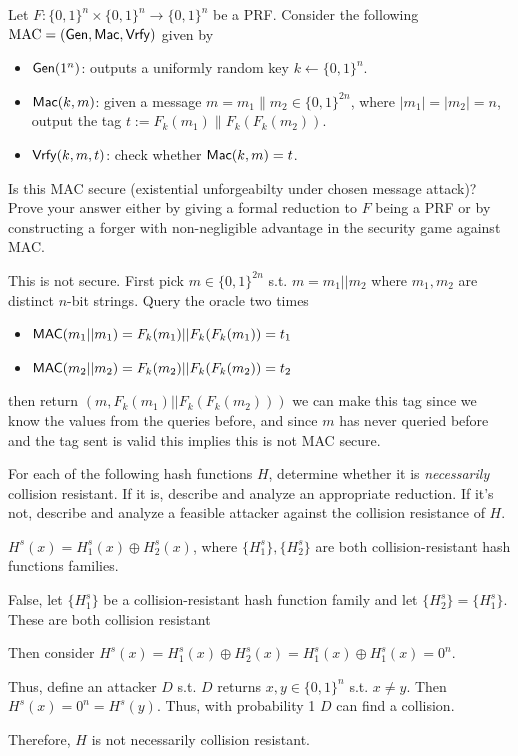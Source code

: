 \documentclass[12pt, letterpaper]{article}
\renewcommand{\t}[1]{\text{#1}}
\newcommand{\skcgen}{{\sf Gen}}
\newcommand{\mac}{{\sf MAC}}
\begin{document}
\begin{problem}{}
    Let $F\colon \{0,1\}^n \times \{0,1\}^n \rightarrow \{0,1\}^n$ be a PRF. 
  Consider the following\\ $\t{MAC}=(\skcgen,{\sf Mac},{\sf Vrfy})$ given by
  \begin{itemize}
    \item $\skcgen(1^n)$: outputs a uniformly random key $k\gets \{0,1\}^n$.
    \item ${\sf Mac}(k,m)$: given a message $m=m_1\|m_2\in\{0,1\}^{2n}$, 
      where $|m_1|=|m_2|=n$, output the tag $t:=F_k(m_1)\| F_k(F_k(m_2))$.
    \item ${\sf Vrfy}(k,m,t)$: check whether ${\sf Mac}(k,m)=t$.
  \end{itemize}
  Is this MAC secure (existential unforgeabilty under chosen message attack)? Prove your answer either by giving a formal reduction
  to $F$ being a PRF or by constructing a forger with non-negligible advantage
  in the security game against MAC. 
\end{problem}
\begin{problemproof}
    This is not secure. First pick $m \in \{0,1\}^{2n}$ s.t. $m=m_1||m_2$ where $m_1,m_2$ are distinct $n$-bit strings.
    Query the oracle two times
    \begin{itemize}
        \item $\mac(m_1||m_1)=F_k(m_1)||F_k(F_k(m_1))=t_1$
        \item $\mac(m_2||m_2)=F_k(m_2)||F_k(F_k(m_2))=t_2$
    \end{itemize}
    then return $(m, F_k(m_1)||F_k(F_k(m_2)))$ we can make this tag since we know the values from the queries before, and since $m$ has never queried before and the tag sent is valid this implies this is not 
    MAC secure.
\end{problemproof}

\begin{problem}{}
    For each of the following hash functions $H$, determine whether it
  is \emph{necessarily} collision resistant. If it is, describe and
  analyze an appropriate reduction. If it's not, describe and analyze
  a feasible attacker against the collision resistance of $H$.
\end{problem}

\begin{subproblem}{}
    $H^{s}(x) = H_1^{s}(x) \oplus H_2^{s}(x)$, where $\{H^s_1\}, \{H^s_2\}$ are both
    collision-resistant hash functions families.
\end{subproblem}
\begin{problemproof}
    False, let $\{H_1^s\}$ be a collision-resistant hash function family and let $\{H_2^s\}=\{H_1^s\}$. These are both collision
    resistant

    Then consider $H^s(x)=H_1^s(x) \oplus H_2^s(x)=H_1^s(x) \oplus H_1^s(x)=0^n$.

    Thus, define an attacker $D$ s.t. $D$ returns $x,y \in \{0,1\}^n$ s.t. $x \neq y$. Then $H^s(x)=0^n=H^s(y)$. Thus, with probability 1 $D$ can find a collision.

    Therefore, $H$ is not necessarily collision resistant.
\end{problemproof}
\end{document}
